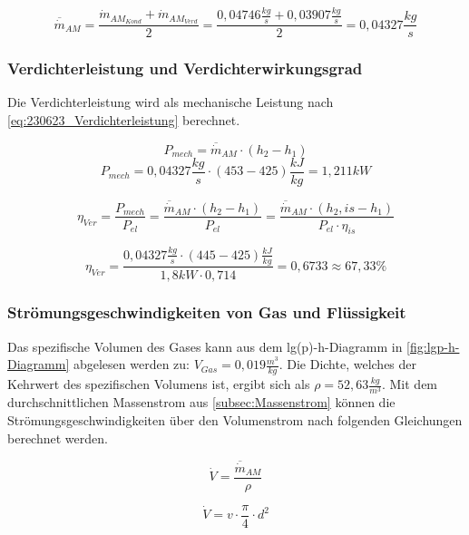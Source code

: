 $$\overline{\dot m}_{AM} = \frac{\dot m_{AM_{Kond}}+\dot m_{AM_{Verd}}}{2} = \frac{0,04746 \frac{kg}{s}+0,03907 \frac{kg}{s}}{2} = 0,04327 \frac{kg}{s} $$



\subsubsection{Verdichterleistung und Verdichterwirkungsgrad}

Die Verdichterleistung wird als mechanische Leistung nach \autoref{eq:230623_Verdichterleistung} berechnet.

\begin{equation}
    P_{mech} = \overline{\dot m}_{AM} \cdot (h_2-h_1)
\label{eq:230623_Verdichterleistung}
\end{equation}
$$  P_{mech} = 0,04327 \frac{kg}{s} \cdot (453-425)\frac{kJ}{kg} = 1,211 kW $$

\begin{equation}
  \eta_{Ver} = \frac{P_{mech}}{P_{el}}=\frac{\overline{\dot m}_{AM}\cdot (h_2-h_1)}{P_{el}}=\frac{\overline{\dot m}_{AM}\cdot (h_2,is-h_1)}{P_{el}\cdot \eta_{is}}
\label{eq:230623_Verdichterwirkungsgrad}
\end{equation}

$$\eta_{Ver} = \frac{0,04327 \frac{kg}{s}\cdot (445-425)\frac{kJ}{kg}}{1,8 kW \cdot 0,714}= 0,6733 \approx 67,33 \% $$

\subsubsection{Strömungsgeschwindigkeiten von Gas und Flüssigkeit}

Das spezifische Volumen des Gases kann aus dem lg(p)-h-Diagramm in \autoref{fig:lgp-h-Diagramm} abgelesen werden zu: $V_{Gas}=0,019 \frac{m^3}{kg}$. Die Dichte, welches der Kehrwert des spezifischen Volumens ist, ergibt sich als $\rho=52,63 \frac{kg}{m^3}$. 
Mit dem durchschnittlichen Massenstrom aus \autoref{subsec:Massenstrom} können die Strömungsgeschwindigkeiten über den Volumenstrom nach folgenden Gleichungen berechnet werden.

\begin{equation}
    \dot{V}= \frac{\overline{\dot m}_{AM}}{\rho }
    \label{eq:230620_Volumenstrom}
\end{equation}

\begin{equation}
    \dot{V}= v \cdot \frac{\pi}{4} \cdot d^2
    \label{eq:230620_Volumenstrom2}
\end{equation}

